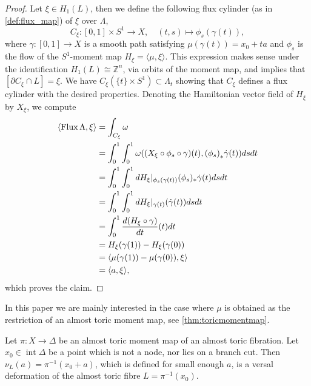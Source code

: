 \documentclass[12pt,a4paper,draft]{scrartcl}
\begin{document}
\begin{proof}
    Let $ξ \in H_1(L)$, then we define the following flux cylinder (as in \cref{def:flux_map}) of $\xi$ over $\Lambda$, 
    \begin{equation}
        C_{\xi} \colon [0,1] \times S^1 \rightarrow X, \quad
        (t,s) \mapsto \phi_s(\gamma(t)),
    \end{equation}
    where $\gamma \colon [0,1] \rightarrow X$ is a smooth path satisfying $\mu(\gamma(t)) = x_0 + ta$ and $\phi_s$ is the flow of the $S^1$-moment map $H_{\xi} = \langle \mu , \xi \rangle$.
    This expression makes sense under the identification $H_1(L) \cong \mathbb{Z}^n$, via orbits of the moment map, and implies that $[\partial C_{\xi} \cap L] = \xi$.
    We have $C_{\xi}(\{t\} \times S^1) \subset \Lambda_t$ showing that $C_{\xi}$ defines a flux cylinder with the desired properties.
    Denoting the Hamiltonian vector field of $H_{\xi}$ by $X_{\xi}$, we compute
    \begin{align*}
        \langle \operatorname{Flux} \Lambda , \xi \rangle
        &= \int_{C_{\xi}} \omega \\
        &= \int_0^1 \int_0^1 \omega\qty(\qty(X_{\xi} \circ \phi_s \circ \gamma)(t) , \qty(\phi_s)_*\dot{\gamma}(t) ) ds dt \\
        &= \int_0^1 \int_0^1 dH_{\xi}\vert_{\phi_s(\gamma(t))} (\phi_s)_*\dot{\gamma}(t) ds dt \\
        &= \int_0^1 \int_0^1 dH_{\xi}\vert_{\gamma(t)} (\dot{\gamma}(t))ds dt \\
        &= \int_0^1 \frac{d (H_{\xi} \circ \gamma)}{dt} (t) dt \\
        &= H_{\xi}(\gamma(1)) - H_{\xi}(\gamma(0)) \\
        &= \langle \mu(\gamma(1)) - \mu(\gamma(0)), \xi \rangle \\
        &= \langle a , \xi \rangle,
    \end{align*}
which proves the claim.
\end{proof}


In this paper we are mainly interested in the case where $\mu$ is obtained as the restriction of an almost toric moment map, see \cref{thm:toricmomentmap}. 

\begin{corollary}
    \label{thm:VDatffibres}
    Let $\pi \colon X \rightarrow \Delta$ be an almost toric moment map of an almost toric fibration.
    Let $x_0 \in \operatorname{int}\Delta$ be a point which is not a node, nor lies on a branch cut.
    Then $\nu_L(a) = \pi^{-1}(x_0 + a)$, which is defined for small enough $a$, is a versal deformation of the almost toric fibre $L = \pi^{-1}(x_0)$.
\end{corollary}
\end{document}
